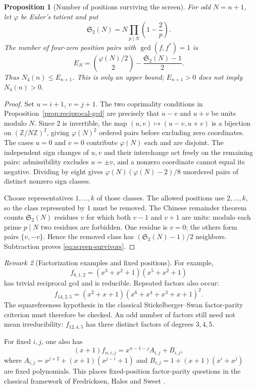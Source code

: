 \documentclass[11pt]{article}
\newtheorem{proposition}{Proposition}[section]
\theoremstyle{definition}
\theoremstyle{remark}
\newtheorem{remark}[proposition]{Remark}
\begin{document}
\begin{proposition}[Number of positions surviving the screen]
\label{prop:reciprocal-survivors}
For odd \(N=n+1\), let \(\varphi\) be Euler's totient and put
\[
 \mathfrak S_2(N)=N\prod_{p\mid N}\left(1-\frac2p\right).
\]
The number of four-zero position pairs with \(\gcd(f,f^*)=1\) is
\begin{equation}\label{eq:screen-survivors}
 E_N=\binom{\varphi(N)/2}{2}-\frac{\mathfrak S_2(N)-1}{2}.
\end{equation}
Thus \(N_4(n)\le E_{n+1}\). This is only an upper bound;
\(E_{n+1}>0\) does not imply \(N_4(n)>0\).
\end{proposition}
\begin{proof}
Set \(u=i+1\), \(v=j+1\). The two coprimality conditions in
Proposition~\ref{prop:reciprocal-gcd} are precisely that \(u-v\)
and \(u+v\) be units modulo \(N\). Since \(2\) is invertible,
the map \((u,v)\mapsto(u-v,u+v)\) is a bijection on
\((\mathbb Z/N\mathbb Z)^2\), giving \(\varphi(N)^2\) ordered
pairs before excluding zero coordinates. The cases \(u=0\) and
\(v=0\) contribute \(\varphi(N)\) each and are disjoint.
The independent sign changes of \(u,v\) and their interchange
act freely on the remaining pairs: admissibility excludes
\(u=\pm v\), and a nonzero coordinate cannot equal its negative.
Dividing by eight gives
\(\varphi(N)(\varphi(N)-2)/8\) unordered pairs of distinct
nonzero sign classes.

Choose representatives \(1,\ldots,k\) of those classes. The
allowed positions use \(2,\ldots,k\), so the class represented
by \(1\) must be removed. The Chinese remainder theorem counts
\(\mathfrak S_2(N)\) residues \(v\) for which both \(v-1\) and
\(v+1\) are units: modulo each prime \(p\mid N\) two residues
are forbidden. One residue is \(v=0\); the others form pairs
\(\{v,-v\}\). Hence the removed class has
\((\mathfrak S_2(N)-1)/2\) neighbors. Subtraction proves
\eqref{eq:screen-survivors}.
\end{proof}

\begin{remark}[Factorization examples and fixed positions]
\label{rem:screen-scope}
For example,
\[
 f_{8,1,2}=(x^3+x^2+1)(x^5+x^2+1)
\]
has trivial reciprocal gcd and is reducible. Repeated factors also occur:
\[
 f_{14,2,5}=(x^2+x+1)(x^6+x^4+x^3+x+1)^2.
\]
The squarefreeness hypothesis in the classical
Stickelberger--Swan factor-parity criterion \cite{Swan62} must
therefore be checked. An odd number of factors still need not mean
irreducibility: \(f_{12,4,5}\) has three distinct factors of degrees
\(3,4,5\).

For fixed \(i,j\), one also has
\[
 (x+1)f_{n,i,j}=x^{n-1-j}A_{i,j}+B_{i,j},
\]
where \(A_{i,j}=x^{j+2}+(x+1)(x^{j-i}+1)\) and
\(B_{i,j}=1+(x+1)(x^i+x^j)\) are fixed polynomials.
This places fixed-position factor-parity questions in the
classical framework of Fredricksen, Hales and Sweet \cite{FHS86}.
\end{remark}
\end{document}
